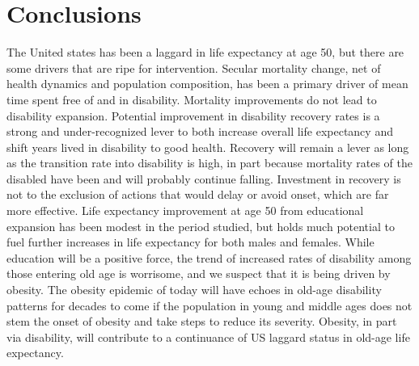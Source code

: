\section{Conclusions}
The United states has been a laggard in life expectancy at age 50, but there are some drivers that are ripe for intervention. Secular mortality change, net of health dynamics and population composition, has been a primary driver of mean time spent free of and in disability. Mortality improvements do not lead to disability expansion. Potential improvement in disability recovery rates is a strong and under-recognized lever to both increase overall life expectancy and shift years lived in disability to good health. Recovery will remain a lever as long as the transition rate into disability is high, in part because mortality rates of the disabled have been and will probably continue falling. Investment in recovery is not to the exclusion of actions that would delay or avoid onset, which are far more effective. Life expectancy improvement at age 50 from educational expansion has been modest in the period studied, but holds much potential to fuel further increases in life expectancy for both males and females. While education will be a positive force, the trend of increased rates of disability among those entering old age is worrisome, and we suspect that it is being driven by obesity. The obesity epidemic of today will have echoes in old-age disability patterns for decades to come if the population in young and middle ages does not stem the onset of obesity and take steps to reduce its severity. Obesity, in part via disability, will contribute to a continuance of US laggard status in old-age life expectancy.  


  

